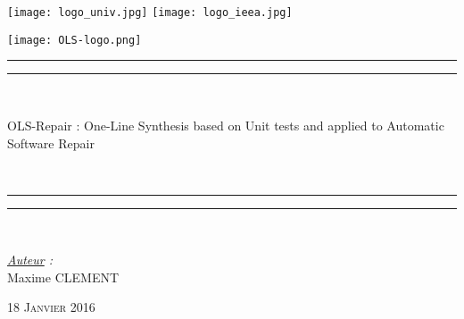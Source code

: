 \thispagestyle{cover}

\texttt{[image: logo\_univ.jpg]}
 \hfill \texttt{[image: logo\_ieea.jpg]} \\

\vspace*{10mm}

\begin{center}

	\vspace*{10mm}
	\texttt{[image: OLS-logo.png]}


	\rule[0.5ex]{\linewidth}{2pt}\vspace*{-\baselineskip}\vspace*{3.2pt}




	\rule[0.5ex]{\linewidth}{1pt}\\[\baselineskip]

		\begin{Huge}OLS-Repair : One-Line Synthesis based on Unit tests and applied to Automatic Software Repair \end{Huge}\\[4mm]

	\rule[0.5ex]{\linewidth}{1pt}\vspace*{-\baselineskip}\vspace{3.2pt}
	\rule[0.5ex]{\linewidth}{2pt}\\

	\vspace*{20mm}

	{\LARGE \textit{\underline{Auteur} :}}\\
	\vspace*{3mm}
	{\LARGE Maxime CLEMENT}\\
	
	\vspace*{20mm}
	
	{\LARGE\textsc{18 Janvier 2016}}
	
\end{center}